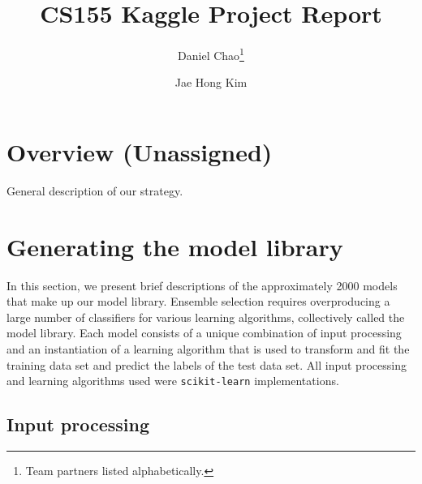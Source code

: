 \documentclass{article}
\title{CS155 Kaggle Project Report}
\author{Daniel Chao\thanks{Team partners listed alphabetically.} \and Jae Hong Kim\footnotemark[1]}
\date{ }
\renewcommand{\(}{\left(}
\renewcommand{\)}{\right)}
\begin{document}
\maketitle 
\tableofcontents 

\section{Overview (Unassigned)}
General description of our strategy. 

\section{Generating the model library}
In this section, we present brief descriptions of the approximately 2000 models that make up our model library.  Ensemble selection requires overproducing a large number of classifiers for various learning algorithms, collectively called the model library.  Each model consists of a unique combination of input processing and an instantiation of a learning algorithm that is used to transform and fit the training data set and predict the labels of the test data set.  All input processing and learning algorithms used were \texttt{scikit-learn} implementations.  

  \subsection{Input processing}
\end{document}

